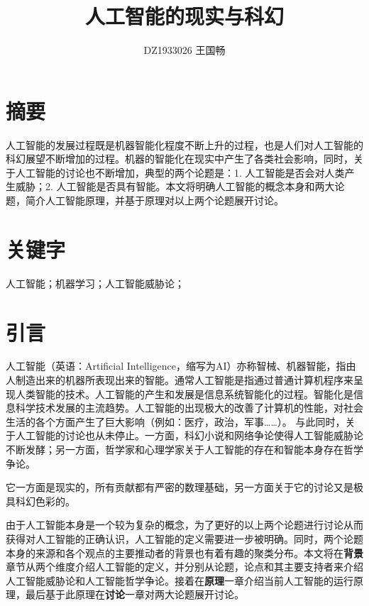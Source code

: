 \documentclass[fontset=fandol,UTF8]{article}
\begin{document}

    

\title{人工智能的现实与科幻}
\author{DZ1933026 王国畅}
\maketitle
\section*{摘要}
人工智能的发展过程既是机器智能化程度不断上升的过程，也是人们对人工智能的科幻展望不断增加的过程。机器的智能化在现实中产生了各类社会影响，同时，关于人工智能的讨论也不断增加，典型的两个论题是：1. 人工智能是否会对人类产生威胁；2. 人工智能是否具有智能。本文将明确人工智能的概念本身和两大论题，简介人工智能原理，并基于原理对以上两个论题展开讨论。
\section*{关键字}
人工智能；机器学习；人工智能威胁论；
\section{引言}
人工智能（英语：Artificial Intelligence，缩写为AI）亦称智械、机器智能，指由人制造出来的机器所表现出来的智能。通常人工智能是指通过普通计算机程序来呈现人类智能的技术\cite{wikiai}。人工智能的产生和发展是信息系统智能化的过程。智能化是信息科学技术发展的主流趋势。人工智能的出现极大的改善了计算机的性能，对社会生活的各个方面产生了巨大影响（例如：医疗，政治，军事……）。
与此同时，关于人工智能的讨论也从未停止。一方面，科幻小说和网络争论使得人工智能威胁论不断发酵；另一方面，哲学家和心理学家关于人工智能的存在和智能本身存在哲学争论。

它一方面是现实的，所有贡献都有严密的数理基础，另一方面关于它的讨论又是极具科幻色彩的。

由于人工智能本身是一个较为复杂的概念，为了更好的以上两个论题进行讨论从而获得对人工智能的正确认识，人工智能的定义需要进一步被明确。同时，两个论题本身的来源和各个观点的主要推动者的背景也有着有趣的聚类分布。本文将在\textbf{背景}章节从两个维度介绍人工智能的定义，并分别从论题，论点和其主要支持者来介绍人工智能威胁论和人工智能哲学争论。接着在\textbf{原理}一章介绍当前人工智能的运行原理，最后基于此原理在\textbf{讨论}一章对两大论题展开讨论。

\end{document}
